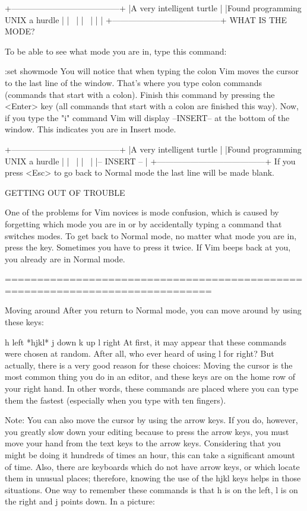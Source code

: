 +---------------------------------------+
|A very intelligent turtle      |
|Found programming UNIX a hurdle    |
|~                  |
|~                  |
|                   |
+---------------------------------------+
WHAT IS THE MODE?

To be able to see what mode you are in, type this command:

:set showmode
You will notice that when typing the colon Vim moves the cursor to the last line of the window. That's where you type colon commands (commands that start with a colon). Finish this command by pressing the <Enter> key (all commands that start with a colon are finished this way). Now, if you type the "i" command Vim will display --INSERT-- at the bottom of the window. This indicates you are in Insert mode.

+---------------------------------------+
|A very intelligent turtle      |
|Found programming UNIX a hurdle    |
|~                  |
|~                  |
|-- INSERT --               |
+---------------------------------------+
If you press <Esc> to go back to Normal mode the last line will be made blank.

GETTING OUT OF TROUBLE

One of the problems for Vim novices is mode confusion, which is caused by forgetting which mode you are in or by accidentally typing a command that switches modes. To get back to Normal mode, no matter what mode you are in, press the key. Sometimes you have to press it twice. If Vim beeps back at you, you already are in Normal mode.

==============================================================================

Moving around
After you return to Normal mode, you can move around by using these keys:

h   left                        *hjkl*
j   down
k   up
l   right
At first, it may appear that these commands were chosen at random. After all, who ever heard of using l for right? But actually, there is a very good reason for these choices: Moving the cursor is the most common thing you do in an editor, and these keys are on the home row of your right hand. In other words, these commands are placed where you can type them the fastest (especially when you type with ten fingers).

Note:
You can also move the cursor by using the arrow keys.  If you do,
however, you greatly slow down your editing because to press the arrow
keys, you must move your hand from the text keys to the arrow keys.
Considering that you might be doing it hundreds of times an hour, this
can take a significant amount of time.
   Also, there are keyboards which do not have arrow keys, or which
locate them in unusual places; therefore, knowing the use of the hjkl
keys helps in those situations.
One way to remember these commands is that h is on the left, l is on the right and j points down. In a picture:

